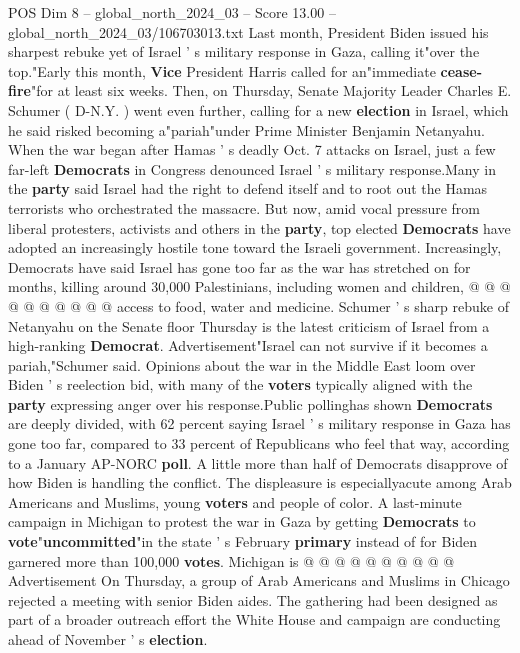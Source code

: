 \begin{textsample}{POS Dim 8 – global\_north\_2024\_03 – Score 13.00 – global\_north\_2024\_03/106703013.txt}  \label{ex:f8_pos_004}
Last month, President Biden issued his sharpest rebuke yet of Israel ' s military response in Gaza, calling it"over the top."Early this month, \textbf{Vice} President Harris called for an"immediate \textbf{cease-fire}"for at least six weeks.
Then, on Thursday, Senate Majority Leader Charles E.
Schumer ( D-N.Y. ) went even further, calling for a new \textbf{election} in Israel, which he said risked becoming a"pariah"under Prime Minister Benjamin Netanyahu.
When the war began after Hamas ' s deadly Oct. 7 attacks on Israel, just a few far-left \textbf{Democrats} in Congress denounced Israel ' s military response.Many in the \textbf{party} said Israel had the right to defend itself and to root out the Hamas terrorists who orchestrated the massacre.
But now, amid vocal pressure from liberal protesters, activists and others in the \textbf{party}, top elected \textbf{Democrats} have adopted an increasingly hostile tone toward the Israeli government.
Increasingly, Democrats have said Israel has gone too far as the war has stretched on for months, killing around 30,000 Palestinians, including women and children, @ @ @ @ @ @ @ @ @ @ access to food, water and medicine.
Schumer ' s sharp rebuke of Netanyahu on the Senate floor Thursday is the latest criticism of Israel from a high-ranking \textbf{Democrat}.
Advertisement"Israel can not survive if it becomes a pariah,"Schumer said.
Opinions about the war in the Middle East loom over Biden ' s reelection bid, with many of the \textbf{voters} typically aligned with the \textbf{party} expressing anger over his response.Public pollinghas shown \textbf{Democrats} are deeply divided, with 62 percent saying Israel ' s military response in Gaza has gone too far, compared to 33 percent of Republicans who feel that way, according to a January AP-NORC \textbf{poll}.
A little more than half of Democrats disapprove of how Biden is handling the conflict.
The displeasure is especiallyacute among Arab Americans and Muslims, young \textbf{voters} and people of color.
A last-minute campaign in Michigan to protest the war in Gaza by getting \textbf{Democrats} to \textbf{vote}"\textbf{uncommitted}"in the state ' s February \textbf{primary} instead of for Biden garnered more than 100,000 \textbf{votes}.
Michigan is @ @ @ @ @ @ @ @ @ @ Advertisement On Thursday, a group of Arab Americans and Muslims in Chicago rejected a meeting with senior Biden aides.
The gathering had been designed as part of a broader outreach effort the White House and campaign are conducting ahead of November ' s \textbf{election}.

\end{textsample}
